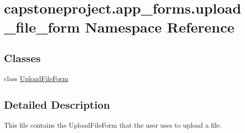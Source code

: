 \hypertarget{namespacecapstoneproject_1_1app__forms_1_1upload__file__form}{}\section{capstoneproject.\+app\+\_\+forms.\+upload\+\_\+file\+\_\+form Namespace Reference}
\label{namespacecapstoneproject_1_1app__forms_1_1upload__file__form}
\subsection*{Classes}
\begin{DoxyCompactItemize}
\item 
class \mbox{\hyperlink{classcapstoneproject_1_1app__forms_1_1upload__file__form_1_1_upload_file_form}{Upload\+File\+Form}}
\end{DoxyCompactItemize}


\subsection{Detailed Description}
\begin{DoxyVerb}This file contains the UploadFileForm that the user uses to upload a file.
\end{DoxyVerb}
 